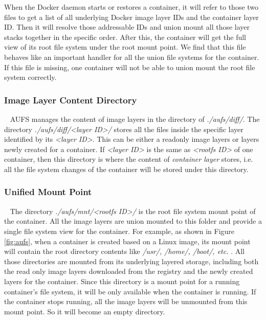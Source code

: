 
When the Docker daemon starts or restores a container, it will refer to those two files to get a list of all underlying Docker image layer IDs and the container layer ID. Then it will resolve those addressable IDs and union mount all those layer stacks together in the specific order. After this, the container will get the full view of its root file system under the root mount point. 
We find that this file behaves like an important handler for all the union file systems for the container. If this file is missing, one container will not be able to union mount the root file system correctly.


\smallbreak 
\subsubsection{Image Layer Content Directory}
~\smallbreak
AUFS manages the content of image layers in the directory of \textit{./aufs/diff/}. The directory
 \textit{./aufs/diff/<layer ID>/} stores all the files inside the specific layer identified by its \textit{<layer ID>}. This can be either a readonly image layers or layers newly created for a container. If \textit{<layer ID>} is the same as \textit{<rootfs ID>} of one container, then this directory is where the content of \textit{container layer} stores, i.e. all the file system changes of the container will be stored under this directory. 

\smallbreak 
\subsubsection{Unified Mount Point} 
~\smallbreak
The directory \textit{./aufs/mnt/<rootfs ID>/ }  is the root file system mount point of the container. All the image layers are union mounted to this folder and provide a single file system view for the container. For example, as shown in Figure \ref{fig:aufs}, when a container is created based on a Linux image, its mount point will contain the root directory contents like \textit{/usr/, /home/, /boot/, etc. }. All those directories are mounted from its underlying layered storage, including both the read only image layers downloaded from the registry and the newly created layers for the container. 
Since this directory is a mount point for a running container's file system, it will be only available when the container is running. If the container stops running, all the image layers will be unmounted from this mount point. So it will become an empty directory.

